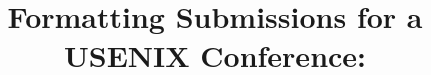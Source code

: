 \documentclass[letterpaper,twocolumn,10pt]{article}
\begin{document}
	
	\title{\Large \bf Formatting Submissions for a USENIX Conference:}
	
	
	\maketitle

\pagestyle{empty}

\begin{abstract}
	
\end{abstract}







\appendix

\end{document}
